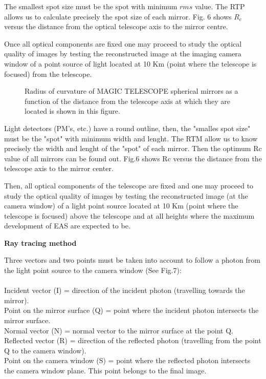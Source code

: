 {The smallest spot size must be the spot with minimum $rms$ value. The RTP allows us to calculate precisely the spot size of each mirror. Fig. 6 shows $R_c$ versus the distance from the optical telescope axis to the mirror centre.

Once all optical components are fixed one may proceed to study the optical quality of images by testing the reconstructed image at the imaging camera window of a point source of light located at 10 Km (point where the telescope is focused) from the telescope.




   \begin{figure}[h]\centering
   \leavevmode
   \epsfxsize=6cm
   \caption{\tiny{Radius of curvature of MAGIC TELESCOPE spherical mirrors as a function of the distance from the telescope axis at which they are located is shown in this figure.}}
   \end{figure}
\vspace{0.2cm}


Light detectors (PM's, etc.) have a round outline, then, the "smalles spot size" must be the "spot" with minimum width and lenght. The RTM allow us to know precisely the width and lenght of the "spot" of each mirror. Then the optimum Rc value of all mirrors can be found out.
Fig.6 shows Rc versus the distance from the telescope axis to the mirror center.


Then, all optical components of the telescope are fixed and one may proceed to study the optical quality of images by testing 
the reconstructed image (at the camera window) of a light point source located at 10 Km (point where the telescope is focused) above the telescope and at all heights where the maximum development of EAS are expected to be. 

\vspace{0.5cm}

{\bf Ray tracing method}








Three vectors and two points must be taken into account to follow a photon from the light point source to the camera window (See Fig.7):\\
\\
Incident vector (I) = direction of the incident photon (travelling towards the mirror).\\
Point on the mirror surface (Q) = point where the incident photon intersects the mirror surface. \\
Normal vector (N) = normal vector to the mirror surface at the point Q.\\
Reflected vector (R) = direction of the reflected photon (travelling from the point Q to the camera window).\\
Point on the camera window (S) = point where the reflected photon intersects the camera window plane. This point belongs to the final image.\\

}
